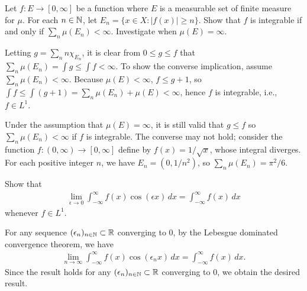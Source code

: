\begin{prob}[2nd textbook, 1.5.9]
    Let $f: E\rightarrow[0, \infty]$ be a function where $E$ is a measurable set of finite measure for $\mu$.
    For each $n\in{\mathbb{N}}$, let $E_n=\{x\in X : |f(x)|\geq n\}$.
    Show that $f$ is integrable if and only if $\sum_n\mu(E_n)<\infty$.
    Investigate when $\mu(E)=\infty$.
\end{prob}
\begin{sol}
    Letting $g=\sum_n n\chi_{E_n}$, it is clear from $0\leq g\leq f$ that $\sum_n \mu(E_n)=\int g\leq \int f<\infty$.
    To show the converse implication, assume $\sum_n \mu(E_n)<\infty$.
    Because $\mu(E)<\infty$, $f\leq g+1$, so $\int f\leq\int (g+1)=\sum_n \mu(E_n)+\mu(E)<\infty$, hence $f$ is integrable, i.e., $f\in L^1$.

    Under the assumption that $\mu(E)=\infty$, it is still valid that $g\leq f$ so $\sum_n \mu(E_n)<\infty$ if $f$ is integrable.
    The converse may not hold; consider the function $f: (0, \infty)\rightarrow[0, \infty]$ define by $f(x)=1/\sqrt{x}$, whose integral diverges.
    For each positive integer $n$, we have $E_n=(0, 1/n^2)$, so $\sum_n\mu(E_n)={\pi^2}/{6}$.
\end{sol}

\begin{prob}[2nd textbook, 1.5.10]
    Show that
    \begin{align*}
        \lim_{\epsilon\rightarrow 0}\int_{-\infty}^\infty f(x)\cos(\epsilon x)\,dx=\int_{-\infty}^\infty f(x)\,dx
    \end{align*}
    whenever $f\in L^1$.
\end{prob}
\begin{sol}
    For any sequence $(\epsilon_n)_{n\in{\mathbb{N}}}\subset{\mathbb{R}}$ converging to 0, by the Lebesgue dominated convergence theorem, we have
    \begin{align*}
        \lim_{n\rightarrow\infty}\int_{-\infty}^\infty f(x)\cos(\epsilon_n x)\,dx=\int_{-\infty}^\infty f(x)\,dx.
    \end{align*}
    Since the result holds for any $(\epsilon_n)_{n\in{\mathbb{N}}}\subset{\mathbb{R}}$ converging to 0, we obtain the desired result.
\end{sol}

